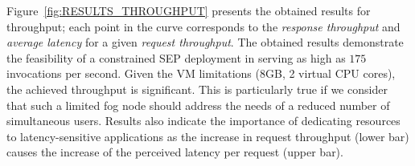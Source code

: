Figure~\ref{fig:RESULTS_THROUGHPUT} presents the obtained results for throughput; each point in the curve corresponds to the \textit{response throughput} and \textit{average latency} for a given \textit{request throughput}. 
%
The obtained results demonstrate the feasibility of a constrained SEP deployment in serving as high as $175$ invocations per second. Given the VM limitations (8GB, 2 virtual CPU cores), the achieved throughput is significant. This is particularly true if we consider that such a limited fog node should address the needs of a reduced number of simultaneous users. Results also indicate the importance of dedicating resources to latency-sensitive applications as the increase in request throughput (lower bar) causes the increase of the perceived latency per request (upper bar). 



